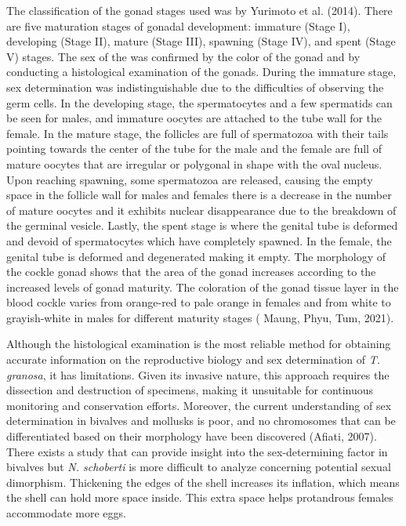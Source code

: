 The classification of the gonad stages used was by Yurimoto et al. (2014). There are five maturation stages of gonadal development: immature (Stage I), developing (Stage II), mature (Stage III), spawning (Stage IV), and spent (Stage V) stages. The sex of the \Tgranosa was confirmed by the color of the gonad and by conducting a histological examination of the gonads. During the immature stage, sex determination was indistinguishable due to the difficulties of observing the germ cells. In the developing stage, the spermatocytes and a few spermatids can be seen for males, and immature oocytes are attached to the tube wall for the female. In the mature stage, the follicles are full of spermatozoa with their tails pointing towards the center of the tube for the male and the female are full of mature oocytes that are irregular or polygonal in shape with the oval nucleus. Upon reaching spawning, some spermatozoa are released, causing the empty space in the follicle wall for males and females there is a decrease in the number of mature oocytes and it exhibits nuclear disappearance due to the breakdown of the germinal vesicle. Lastly, the spent stage is where the genital tube is deformed and devoid of spermatocytes which have completely spawned. In the female, the genital tube is deformed and degenerated making it empty. The morphology of the cockle gonad shows that the area of the gonad increases according to the increased levels of gonad maturity. The coloration of the gonad tissue layer in the blood cockle varies from orange-red to pale orange in females and from white to grayish-white in males for different maturity stages ( Maung, Phyu, Tum, 2021). 

Although the histological examination is the most reliable method for obtaining accurate information on the reproductive biology and sex determination of \textit{T. granosa}, it has limitations. Given its invasive nature, this approach requires the dissection and destruction of specimens, making it unsuitable for continuous monitoring and conservation efforts. Moreover, the current understanding of sex determination in bivalves and mollusks is poor, and no chromosomes that can be differentiated based on their morphology have been discovered (Afiati, 2007). There exists a study that can provide insight into the sex-determining factor in bivalves but  \textit{N. schoberti} is more difficult to analyze concerning potential sexual dimorphism. Thickening the edges of the shell increases its inflation, which means the shell can hold more space inside. This extra space helps protandrous females accommodate more eggs.

